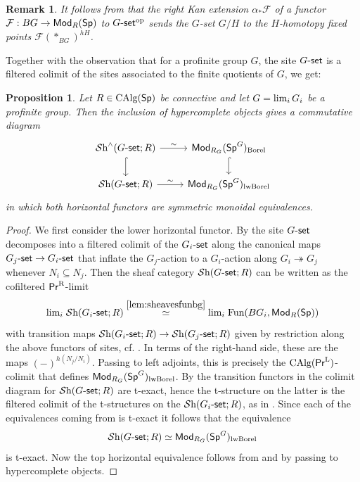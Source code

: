 \documentclass[reqno]{amsart}
\numberwithin{equation}{section}\theoremstyle{thms}
\newtheorem{prop}[equation]{Proposition}
\theoremstyle{defn}
\newtheorem{rem}[equation]{Remark}
\newcommand{\cF}{\mathcal{F}}
\newcommand{\tn}[1]{\textnormal{#1}}
\newcommand{\tsf}[1]{\textsf{\textup{#1}}}
\newcommand{\mcal}[1]{\mathcal{#1}}
\newcommand{\op}{\tn{op}}
\newcommand{\fun}{\tn{Fun}}
\newcommand{\sheaves}{\mcal{S}\tn{h}}
\newcommand{\calg}{\tn{CAlg}}
\newcommand{\Mod}{\tsf{Mod}}
\newcommand{\spec}{\tsf{Sp}}
\newcommand{\specg}{\tsf{Sp}^G}
\newcommand{\prl}{\tsf{Pr}^{\tn{L}}}
\newcommand{\prr}{\tsf{Pr}^{\tn{R}}}
\newcommand{\gset}{G\tsf{-set}}
\begin{document}
\begin{rem}
It follows from \cite[Lemma 4.3]{cm21} that the right Kan extension $\alpha_*\cF$ of a functor $\cF: BG \to \Mod_R(\spec)$ to $\gset^\op$ sends the $G$-set $G/H$ to the $H$-homotopy fixed points $\cF(\ast_{BG})^{hH}$.
\end{rem}

Together with the observation that for a profinite group $G$, the site $\gset$ is a filtered colimit of the sites associated to the finite quotients of $G$, we get:

\begin{prop}\label{prop:sheavesborelcomplete}
Let $R \in \calg(\spec)$ be connective and let $G= \tn{lim}_i \, G_i$ be a profinite group. Then the inclusion of hypercomplete objects gives a commutative diagram
\[\begin{tikzcd}
	{\sheaves^{\wedge}(\gset;R)} & {\Mod_{R_G}(\specg)_{\tn{Borel}}} \\
	{\sheaves(\gset;R)} & {\Mod_{R_G}(\specg)_{\tn{lwBorel}}}
	\arrow["\sim", from=1-1, to=1-2]
	\arrow[hook, from=1-1, to=2-1]
	\arrow[hook, from=1-2, to=2-2]
	\arrow["\sim", from=2-1, to=2-2]
\end{tikzcd}\]
in which both horizontal functors are symmetric monoidal equivalences.
\end{prop}
\begin{proof}
We first consider the lower horizontal functor. By \cite[Construction 4.5]{cm21} the site $\gset$ decomposes into a filtered colimit of the $G_i\tsf{-set}$ along the canonical maps $G_j\tsf{-set} \to G_i\tsf{-set}$ that inflate the $G_j$-action to a $G_i$-action along $G_i \twoheadrightarrow G_j$ whenever $N_i \subseteq N_j$. Then the sheaf category $\sheaves(\gset;R)$ can be written as the cofiltered $\prr$-limit
$$\tn{lim}_i \; \sheaves(G_i\tsf{-set};R) \stackrel{\ref{lem:sheavesfunbg}}{\simeq} \tn{lim}_i \; \fun(BG_i,\Mod_R(\spec))$$
with transition maps $\sheaves(G_i\tsf{-set};R) \to \sheaves(G_j\tsf{-set};R)$ given by restriction along the above functors of sites, cf. \cite[§3.1]{cm21}. In terms of the right-hand side, these are the maps $(-)^{h(N_j/N_i)}$. Passing to left adjoints, this is precisely the $\calg(\prl)$-colimit that defines $\Mod_{R_G}(\specg)_{\tn{lwBorel}}$. By \cite[Remark 1.3.2.8]{lur18} the transition functors in the colimit diagram for $\sheaves(\gset;R)$ are t-exact, hence the t-structure on the latter is the filtered colimit of the t-structures on the $\sheaves(G_i\tsf{-set};R)$, as in . Since each of the equivalences coming from  is t-exact it follows that the equivalence 
$$\sheaves(\gset;R) \simeq \Mod_{R_G}(\specg)_{\tn{lwBorel}}$$
is t-exact. Now the top horizontal equivalence follows from  and  by passing to hypercomplete objects.
\end{proof}
\end{document}
